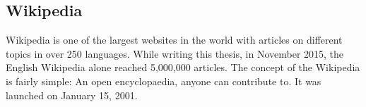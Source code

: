 \documentclass[11pt]{article}
\begin{document}
\subsection{Wikipedia}
Wikipedia is one of the largest websites in the world with articles on different topics in over 250 languages. While writing this thesis, in November 2015, the English Wikipedia alone reached 5,000,000 articles. 
The concept of the Wikipedia is fairly simple: An open encyclopaedia, anyone can contribute to. It was launched on January 15, 2001. 

\begin{itemize}

\end{itemize}
\end{document}

